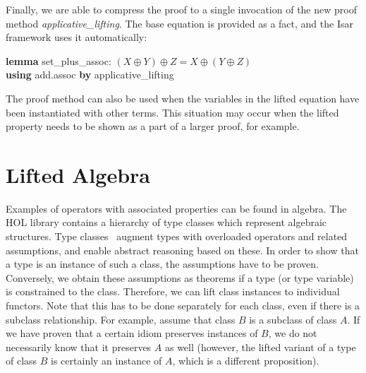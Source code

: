 Finally, we are able to compress the proof to a single invocation of the new
proof method \emph{applicative\_lifting}.
The base equation is provided as a fact, and the Isar framework uses it
automatically:
\begin{isabelle}
\textbf{lemma} set\_plus\_assoc: $(X \oplus Y) \oplus Z = X \oplus (Y \oplus Z)$ \\
\textbf{using} add.assoc \textbf{by} applicative\_lifting
\end{isabelle}
The proof method can also be used when the variables in the lifted equation
have been instantiated with other terms.
This situation may occur when the lifted property needs to be shown as a part of
a larger proof, for example.


\section{Lifted Algebra}\label{subsec:lifted-algebra}

Examples of operators with associated properties can be found in algebra.
The HOL library contains a hierarchy of type classes which represent algebraic
structures.
Type classes~\cite{haftmann07} augment types with overloaded operators and
related assumptions, and enable abstract reasoning based on these.
In order to show that a type is an instance of such a class, the assumptions
have to be proven.
Conversely, we obtain these assumptions as theorems if a type (or type variable)
is constrained to the class.
Therefore, we can lift class instances to individual functors.
Note that this has to be done separately for each class, even if there is a
subclass relationship.
For example, assume that class $B$ is a subclass of class $A$.
If we have proven that a certain idiom preserves instances of $B$,
we do not necessarily know that it preserves $A$ as well
(however, the lifted variant of a type of class $B$ is certainly an instance of
$A$, which is a different proposition).

